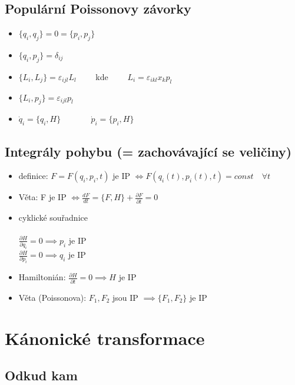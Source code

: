 \documentclass[a5paper,12pt]{article}
\begin{document}
\subsection{Populární Poissonovy závorky}

\begin{itemize}
	\item $\{q_i, q_j\} = 0 = \{p_i, p_j\}$
	\item $\{q_i, p_j\} = \delta_{ij}$
	\item $\{L_i, L_j\} = \varepsilon_{ijl}L_l \qquad$ kde $\qquad L_i = \varepsilon_{ikl}x_k p_l$
	\item $\{L_i, p_j\} = \varepsilon_{ijl}p_l$
	\item $\dot{q}_i = \{q_i, H\}$ $\quad\qquad$ $\dot{p}_i = \{p_i, H\}$
\end{itemize}

\subsection{Integrály pohybu (= zachovávající se veličiny)}

\begin{itemize}
	\item definice: $F=F(q_i, p_i, t)$ je IP ${\iff} F(q_i(t), p_i(t), t) = const \quad \forall t$
	\item Věta: F je IP ${\iff} \boxed{\frac{dF}{dt} = \{F, H\} + \frac{\partial F}{\partial t} = 0}$
	\item cyklické souřadnice\\ \\
		$\frac{\partial H}{\partial q_i} = 0 \implies p_i$ je IP\\
		$\frac{\partial H}{\partial p_i} = 0 \implies q_i$ je IP\\
	\item Hamiltonián: $\frac{\partial H}{\partial t} = 0 \implies H$ je IP
	\item Věta (Poissonova): $F_1, F_2$ jsou IP $\implies \{F_1, F_2\}$ je IP
		
\end{itemize}

\newpage

\section{Kánonické transformace}

\subsection{Odkud kam}
\end{document}
